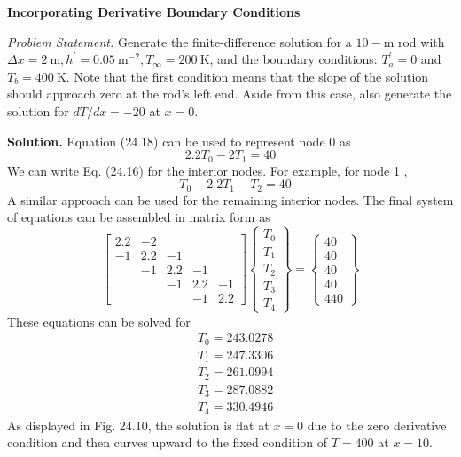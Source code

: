 \documentclass[../main.tex]{subfiles}
\begin{document}
\begin{exmp}
    \textbf{Incorporating Derivative Boundary Conditions}

    \noindent\textit{Problem Statement.} Generate the finite-difference solution for a $10-\mathrm{m}$ rod with $\Delta x=2 \mathrm{~m}, h^{\prime}=0.05 \mathrm{~m}^{-2}, T_{\infty}=200 \mathrm{~K}$, and the boundary conditions: $T_{a}^{\prime}=0$ and $T_{b}=400 \mathrm{~K}$. Note that the first condition means that the slope of the solution should approach zero at the rod's left end. Aside from this case, also generate the solution for $d T / d x=-20$ at $x=0$.

    \noindent\textbf{Solution.} Equation (24.18) can be used to represent node 0 as
    $$
    2.2 T_{0}-2 T_{1}=40
    $$
    We can write Eq. (24.16) for the interior nodes. For example, for node 1 ,
    $$
    -T_{0}+2.2 T_{1}-T_{2}=40
    $$
    A similar approach can be used for the remaining interior nodes. The final system of equations can be assembled in matrix form as
    $$
    \left[\begin{array}{ccccc}
    2.2 & -2 & & & \\
    -1 & 2.2 & -1 & & \\
    & -1 & 2.2 & -1 & \\
    & & -1 & 2.2 & -1 \\
    & & & -1 & 2.2
    \end{array}\right]\left\{\begin{array}{l}
    T_{0} \\
    T_{1} \\
    T_{2} \\
    T_{3} \\
    T_{4}
    \end{array}\right\}=\left\{\begin{array}{c}
    40 \\
    40 \\
    40 \\
    40 \\
    440
    \end{array}\right\}
    $$
    These equations can be solved for
    $$
    \begin{aligned}
    &T_{0}=243.0278 \\
    &T_{1}=247.3306 \\
    &T_{2}=261.0994 \\
    &T_{3}=287.0882 \\
    &T_{4}=330.4946
    \end{aligned}
    $$
    As displayed in Fig. 24.10, the solution is flat at $x=0$ due to the zero derivative condition and then curves upward to the fixed condition of $T=400$ at $x=10$.


\end{exmp}
\end{document}
